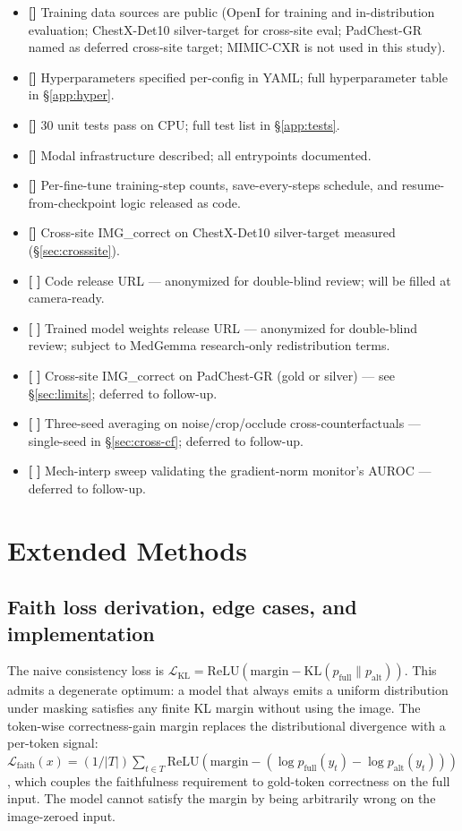 \documentclass{article}
\begin{document}
\begin{itemize}
\item \textbf{[\checkmark]} Training data sources are public (OpenI for training and in-distribution evaluation; ChestX-Det10 silver-target for cross-site eval; PadChest-GR named as deferred cross-site target; MIMIC-CXR is not used in this study).
\item \textbf{[\checkmark]} Hyperparameters specified per-config in YAML; full hyperparameter table in \S\ref{app:hyper}.
\item \textbf{[\checkmark]} 30 unit tests pass on CPU; full test list in \S\ref{app:tests}.
\item \textbf{[\checkmark]} Modal infrastructure described; all entrypoints documented.
\item \textbf{[\checkmark]} Per-fine-tune training-step counts, save-every-steps schedule, and resume-from-checkpoint logic released as code.
\item \textbf{[\checkmark]} Cross-site IMG\_correct on ChestX-Det10 silver-target measured (\S\ref{sec:crosssite}).
\item \textbf{[\,\,]} Code release URL --- anonymized for double-blind review; will be filled at camera-ready.
\item \textbf{[\,\,]} Trained model weights release URL --- anonymized for double-blind review; subject to MedGemma research-only redistribution terms.
\item \textbf{[\,\,]} Cross-site IMG\_correct on PadChest-GR (gold or silver) --- see \S\ref{sec:limits}; deferred to follow-up.
\item \textbf{[\,\,]} Three-seed averaging on noise/crop/occlude cross-counterfactuals --- single-seed in \S\ref{sec:cross-cf}; deferred to follow-up.
\item \textbf{[\,\,]} Mech-interp sweep validating the gradient-norm monitor's AUROC --- deferred to follow-up.
\end{itemize}

\section{Extended Methods}
\label{app:methods}

\subsection{Faith loss derivation, edge cases, and implementation}
\label{app:faith}

The naive consistency loss is
$\mathcal{L}_{\mathrm{KL}} = \mathrm{ReLU}(\text{margin} - \mathrm{KL}(p_{\mathrm{full}} \| p_{\mathrm{alt}}))$.
This admits a degenerate optimum: a model that always emits a uniform
distribution under masking satisfies any finite KL margin without using
the image. The token-wise correctness-gain margin replaces the
distributional divergence with a per-token signal:
$\mathcal{L}_{\mathrm{faith}}(x) = (1/|T|)\sum_{t \in T}\mathrm{ReLU}(\text{margin} - (\log p_{\mathrm{full}}(y_t) - \log p_{\mathrm{alt}}(y_t)))$,
which couples the faithfulness requirement to gold-token correctness on
the full input. The model cannot satisfy the margin by being arbitrarily
wrong on the image-zeroed input.
\end{document}
